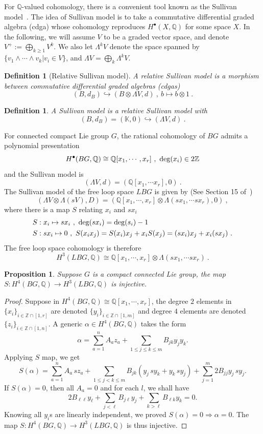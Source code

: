 \documentclass[a4paper,11pt]{article}
\newtheorem{prop}[lemma]{Proposition}
\newtheorem{defn}[lemma]{Definition}
\newcommand{\be}{\begin{equation}}
\newcommand{\ee}{\end{equation}}
\newcommand{\ba}{\begin{aligned}}
\newcommand{\ea}{\end{aligned}}
\def\bbK{\mathbb{K}}
\def\bbQ{\mathbb{Q}}
\def\bbZ{\mathbb{Z}}
\begin{document}
For $\bbQ$-valued cohomology, there is a convenient tool known as the Sullivan model~\cite{ViguPoirrier1976TheHT}. The idea of Sullivan model is to take a commutative differential graded algebra (cdga) whose cohomology reproduces $H^\bullet(X,\bbQ)$ for some space $X$. In the following, we will assume $V$ to be a graded vector space, and denote $V^+:= \bigoplus_{k\ge 1} V^k $. We also let $\Lambda^k V$ denote the space spanned by $\{ v_1\wedge \cdots \wedge v_k|v_i\in V \}$, and $\Lambda V= \bigoplus_k \Lambda^k V$.
\begin{defn}[Relative Sullivan model]
    A relative Sullivan model is a morphism between commutative differential graded algebras (cdgas)
    \be  (B,d_B) \hookrightarrow (B\otimes \Lambda V,d) \ , \ b\mapsto b\otimes 1 \ . \ee
\end{defn}
\begin{defn}
    A Sullivan model is a relative Sullivan model with
    \be   (B,d_B) = (\bbK , 0)  \hookrightarrow (\Lambda V,d) \ . \ee
\end{defn}
For connected compact Lie group $G$, the rational cohomology of $BG$ admits a polynomial presentation
\be
H^\bullet(BG,\bbQ) \cong \bbQ[x_1,\cdots ,x_r] \ , \ {\rm deg}(x_i)\in 2\bbZ
\ee
and the Sullivan model is 
\be (\Lambda V,d) = (\bbQ[x_1,\cdots x_r],0)  \ . \ee
The Sullivan model of the free loop space $LBG$ is given by (See Section 15 of~\cite{Felix:2001rht})
\be (\Lambda V \otimes \Lambda(sV),D) = (\bbQ[x_1,\cdots ,x_r]\otimes \Lambda(sx_1,\cdots sx_r), 0) \ , \ee
where there is a map $S$ relating $x_i$ and $sx_i$
\be\ba &S:x_i\mapsto sx_i \ , \  {\rm deg}(sx_i) = {\rm deg}(s_i)-1\\ &S:sx_i \mapsto 0 \ , \ S(x_ix_j) = S(x_i)x_j + x_i S(x_j)  = (sx_i) x_j + x_i (sx_j) \ . \ea\ee
The free loop space cohomology is therefore
\be H^3(LBG , \bbQ) \cong  \bbQ[x_1,\cdots ,x_r]\otimes \Lambda(sx_1,\cdots sx_r) \ . \ee
\begin{prop}
    Suppose $G$ is a compact connected Lie group, the map $S:H^4(BG,\bbQ) \to H^3(LBG,\bbQ)$ is injective.
\end{prop}
\begin{proof}
    Suppose in $H^4(BG,\bbQ)\cong \bbQ[x_1,\cdots,x_r]$, the degree $2$ elements in $\{x_i\}_{i\in\bbZ\cap[1,r]}$ are denoted $\{y_i\}_{i\in \bbZ\cap [1,m]}$ and degree $4$ elements are denoted $\{z_i\}_{i\in \bbZ\cap [1,n]}$.
    A generic $\alpha\in  H^4(BG,\bbQ)$ takes the form
    \be \alpha = \sum_{a=1}^n A_a z_a + \sum_{1\le j\le k\le m}B_{jk}y_jy_k. \ee
    Applying $S$ map, we get
    \be  S(\alpha)=\sum_{a=1}^n A_a\,sz_a+\sum_{1\le j<k\le m}B_{jk}(y_j\,sy_k+y_k\,sy_j)+\sum_{j=1}^m2B_{jj}y_j\,sy_j. \ee
    If $S(\alpha) = 0$, then all $A_a = 0$ and for each $l$, we shall have
\be 2B_{\ell\ell}y_\ell+\sum_{j<\ell}B_{j\ell}y_j+\sum_{k>\ell}B_{\ell k}y_k=0.
\ee
Knowing all $y_i$s are linearly independent, we proved $S(\alpha) = 0 \Rightarrow \alpha = 0$. The map $S:H^4(BG,\bbQ) \to H^3(LBG,\bbQ)$ is thus injective.
\end{proof}
\end{document}
